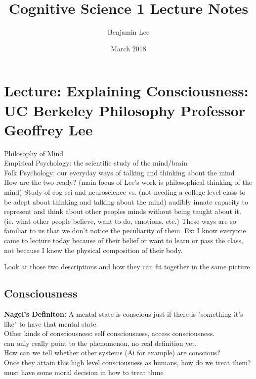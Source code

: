 \documentclass{article}
\title{Cognitive Science 1 Lecture Notes}
\author{Benjamin Lee}
\date{March 2018}
\begin{document}
\maketitle

\section{Lecture: Explaining Consciousness: UC Berkeley Philosophy Professor Geoffrey Lee }

Philosophy of Mind \\
 Empirical Psychology: the scientific study of the mind/brain \\
 Folk Psychology: our everyday ways of talking and thinking about the mind \\
 
How are the two ready? (main focus of Lee's work is philosophical thinking of the mind)
    Study of cog sci and neuroscience vs. (not needing a college level class to be adept about thinking and talking about the mind) audibly innate capacity to represent and think about other peoples minds without being taught about it. (ie. what other people believe, want to do, emotions, etc.) These ways are so familiar to us that we don't notice the peculiarity of them. 
    Ex: I know everyone came to lecture today because of their belief or want to learn or pass the class, not because I knew the physical composition of their body. 
    
Look at those two descriptions and how they can fit together in the same picture \\

\subsection{Consciousness}

\textbf{Nagel's Definiton:} A mental state is conscious just if there is "something it's like" to have that mental state \\
Other kinds of consciousness: self consciousness, access consciousness. \\ 
can only really point to the phenomenon, no real definition yet. \\ 
 
How can we tell whether other systems (Ai for example) are conscious? \\ 
Once they attain this high level consciousness as humans, how do we treat them? must have some moral decision in how to treat thme \\
\end{document}
